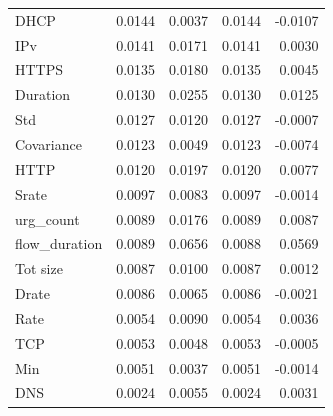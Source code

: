 \begin{tabular}{lrrrr}
DHCP & 0.0144 & 0.0037 & 0.0144 & -0.0107 \\
IPv & 0.0141 & 0.0171 & 0.0141 & 0.0030 \\
HTTPS & 0.0135 & 0.0180 & 0.0135 & 0.0045 \\
Duration & 0.0130 & 0.0255 & 0.0130 & 0.0125 \\
Std & 0.0127 & 0.0120 & 0.0127 & -0.0007 \\
Covariance & 0.0123 & 0.0049 & 0.0123 & -0.0074 \\
HTTP & 0.0120 & 0.0197 & 0.0120 & 0.0077 \\
Srate & 0.0097 & 0.0083 & 0.0097 & -0.0014 \\
urg\_count & 0.0089 & 0.0176 & 0.0089 & 0.0087 \\
flow\_duration & 0.0089 & 0.0656 & 0.0088 & 0.0569 \\
Tot size & 0.0087 & 0.0100 & 0.0087 & 0.0012 \\
Drate & 0.0086 & 0.0065 & 0.0086 & -0.0021 \\
Rate & 0.0054 & 0.0090 & 0.0054 & 0.0036 \\
TCP & 0.0053 & 0.0048 & 0.0053 & -0.0005 \\
Min & 0.0051 & 0.0037 & 0.0051 & -0.0014 \\
DNS & 0.0024 & 0.0055 & 0.0024 & 0.0031 \\
\bottomrule
\end{tabular}
